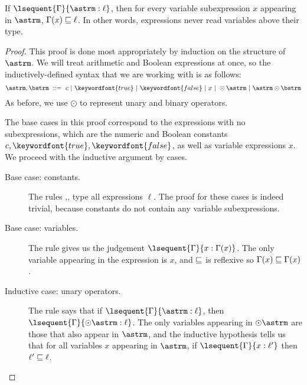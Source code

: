 \documentclass[11pt,twoside]{scrartcl}
\begin{document}
\begin{lemma}
\label{lemma:simplesec}
If $\lsequent{\Gamma}{\astrm : \ell}$, then for every variable subexpression $x$ appearing in $\astrm$, $\Gamma(x) \sqsubseteq \ell$. In other words, expressions never read variables above their type.
\end{lemma}
\begin{proof}
This proof is done most appropriately by induction on the structure of $\astrm$. We will treat arithmetic and Boolean expressions at once, so the inductively-defined syntax that we are working with is as follows:\[
  \astrm,\bstrm ~\bebecomes~
  c
  \alternative
  \keywordfont{true}
  \alternative
  \keywordfont{false}
  \alternative
  x
  \alternative
  \odot \astrm
  \alternative
  \astrm\odot\bstrm
\]
As before, we use $\odot$ to represent unary and binary operators.

The base cases in this proof correspond to the expressions with no subexpressions, which are the numeric and Boolean constants $c,\keywordfont{true},\keywordfont{false}$, as well as variable expressions $x$. We proceed with the inductive argument by cases.
\begin{description}
\item[Base case: constants.] The rules ,, type all expressions $\ell$. The proof for these cases is indeed trivial, because constants do not contain any variable subexpressions.

\item[Base case: variables.] The rule  gives us the judgement $\lsequent{\Gamma}{x : \Gamma(x)}$. The only variable appearing in the expression is $x$, and $\sqsubseteq$ is reflexive so $\Gamma(x) \sqsubseteq \Gamma(x)$.

\item[Inductive case: unary operators.] The rule  says that if $\lsequent{\Gamma}{\astrm : \ell}$, then $\lsequent{\Gamma}{\odot \astrm : \ell}$. The only variables appearing in $\odot \astrm$ are those that also appear in $\astrm$, and the inductive hypothesis tells us that for all variables $x$ appearing in $\astrm$, if $\lsequent{\Gamma}{x : \ell'}$ then $\ell' \sqsubseteq \ell$.


\end{description}
\end{proof}
\end{document}
